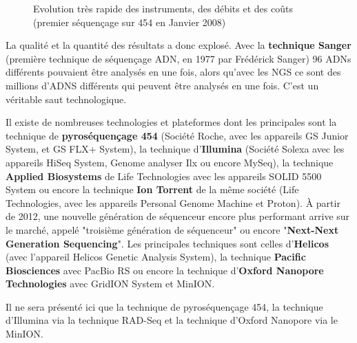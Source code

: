 \documentclass[a4paper]{article}
\begin{document}
\begin{figure}[!h]
\caption{Evolution très rapide des instruments, des débits et des coûts (premier séquençage sur 454 en Janvier 2008)\label{moore}}
\end{figure}

La qualité et la quantité des résultats a donc explosé. Avec la \textbf{technique Sanger} (première technique de séquençage ADN, en 1977 par Frédérick Sanger) 96 ADNs différents pouvaient être analysés en une fois, alors qu'avec les NGS ce sont des millions d'ADNS différents qui peuvent être analysés en une fois. C'est un véritable saut technologique.

Il existe de nombreuses technologies et plateformes dont les principales sont la technique de \textbf{pyroséquençage 454} (Société Roche, avec les appareils GS Junior System, et GS FLX+ System), la technique d'\textbf{Illumina} (Société Solexa avec les appareils HiSeq System, Genome analyser Ilx ou encore MySeq), la technique  \textbf{Applied Biosystems} de Life Technologies avec les appareils SOLID 5500 System ou encore la technique \textbf{Ion Torrent} de la même société (Life Technologies, avec les appareils Personal Genome Machine et Proton). À partir de 2012, une nouvelle génération de séquenceur encore plus performant arrive sur le marché, appelé "troisième génération de séquenceur" ou encore "\textbf{Next-Next Generation Sequencing}". Les principales techniques sont celles d'\textbf{Helicos} (avec l'appareil Helicos Genetic Analysis System), la technique \textbf{Pacific Biosciences} avec PacBio RS ou encore la technique d'\textbf{Oxford Nanopore Technologies} avec GridION System et MinION. 

Il ne sera présenté ici que la technique de pyroséquençage 454, la technique d'Illumina via la technique RAD-Seq et la technique d'Oxford Nanopore via le MinION.
\end{document}
